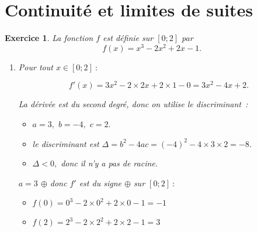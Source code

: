 \documentclass[10pt]{article}
\newtheorem{exo}{Exercice}
\begin{document}

\section{Continuité et limites de suites}




\begin{exo}

La fonction $f$ est définie sur $\left[0;2\right]$ par \[f(x)=x^3 - 2x^2 + 2x-1 .\]

\begin{enumerate}
  \item \medskip

Pour tout $x\in\left[0;2\right]~:$

\[f'(x)=3x^2-2\times 2x+2\times 1-0=3x^2-4x+2.\]

La dérivée est du second degré, donc on utilise le discriminant~:

\begin{itemize}
\item[\textbullet] $a=3,$ $b=-4,$ $c=2.$
\item[\textbullet] le discriminant est $\Delta=b^2-4ac=(-4)^2-4\times 3\times 2=-8.$
\item[\textbullet] $\Delta<0,$ donc il n'y a pas de racine.
\end{itemize}

\medskip



$a=3$  $\oplus$ donc $f'$ est du signe $\oplus$ sur $\left[0;2\right]~:$

\newpage

\setlength{\columnseprule}{1pt}

\begin{multicols}{2}
\begin{center}
\end{center}

\columnbreak

\begin{itemize}
\item[\textbullet] $f(0)=0^3 - 2\times 0^2 + 2\times 0-1=-1$
\item[\textbullet] $f(2)=2^3 - 2\times 2^2 + 2\times 2-1=3$
\end{itemize}



\end{multicols}
\end{enumerate}
\end{exo}
\end{document}
